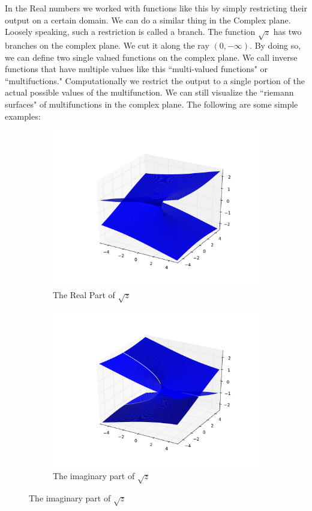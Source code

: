In the Real numbers we worked with functions like this by simply restricting their output on a certain domain. We can do a similar thing in the Complex plane. Loosely speaking, such a restriction is called a branch. The function $\sqrt{z}$ has two branches on the complex plane. We cut it along the ray $(0,-\infty)$. By doing so, we can define two single valued functions on the complex plane. We call inverse functions that have multiple values like this ``multi-valued functions" or ``multifuctions." Computationally we restrict the output to a single portion of the actual possible values of the multifunction. We can still visualize the ``riemann surfaces" of multifunctions in the complex plane. The following are some simple examples:
\begin{figure}[h]

\begin{subfigure}{.49\textwidth}
\includegraphics[width=\textwidth]{RiemannSurface1}
\caption{The Real Part of $\sqrt{z}$}
\end{subfigure}
\begin{subfigure}{.49\textwidth}
\includegraphics[width=\textwidth]{RiemannSurface2}
\caption{The imaginary part of $\sqrt{z}$}
\end{subfigure}
\end{figure}
